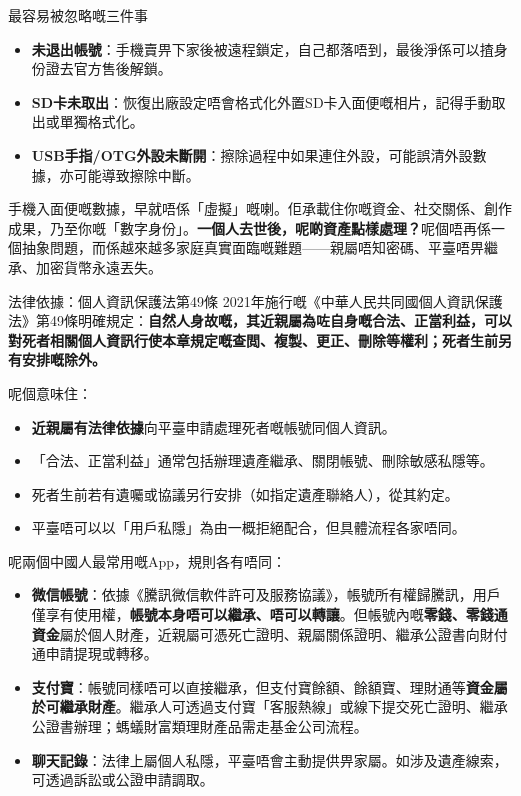 \begin{tcbwarn}{最容易被忽略嘅三件事}
\begin{itemize}
  \item \textbf{未退出帳號}：手機賣畀下家後被遠程鎖定，自己都落唔到，最後淨係可以揸身份證去官方售後解鎖。
  \item \textbf{SD卡未取出}：恢復出廠設定唔會格式化外置SD卡入面便嘅相片，記得手動取出或單獨格式化。
  \item \textbf{USB手指/OTG外設未斷開}：擦除過程中如果連住外設，可能誤清外設數據，亦可能導致擦除中斷。
\end{itemize}

\end{tcbwarn}


手機入面便嘅數據，早就唔係「虛擬」嘅喇。佢承載住你嘅資金、社交關係、創作成果，乃至你嘅「數字身份」。\textbf{一個人去世後，呢啲資產點樣處理？}呢個唔再係一個抽象問題，而係越來越多家庭真實面臨嘅難題——親屬唔知密碼、平臺唔畀繼承、加密貨幣永遠丟失。

\begin{tcbinfo}{法律依據：個人資訊保護法第49條}
2021年施行嘅《中華人民共同國個人資訊保護法》第49條明確規定：\textbf{自然人身故嘅，其近親屬為咗自身嘅合法、正當利益，可以對死者相關個人資訊行使本章規定嘅查閲、複製、更正、刪除等權利；死者生前另有安排嘅除外。}

呢個意味住：

\begin{itemize}
  \item \textbf{近親屬有法律依據}向平臺申請處理死者嘅帳號同個人資訊。
  \item 「合法、正當利益」通常包括辦理遺產繼承、關閉帳號、刪除敏感私隱等。
  \item 死者生前若有遺囑或協議另行安排（如指定遺產聯絡人），從其約定。
  \item 平臺唔可以以「用戶私隱」為由一概拒絕配合，但具體流程各家唔同。
\end{itemize}

\end{tcbinfo}


呢兩個中國人最常用嘅App，規則各有唔同：

\begin{itemize}
  \item \textbf{微信帳號}：依據《騰訊微信軟件許可及服務協議》，帳號所有權歸騰訊，用戶僅享有使用權，\textbf{帳號本身唔可以繼承、唔可以轉讓}。但帳號內嘅\textbf{零錢、零錢通資金}屬於個人財產，近親屬可憑死亡證明、親屬關係證明、繼承公證書向財付通申請提現或轉移。
  \item \textbf{支付寶}：帳號同樣唔可以直接繼承，但支付寶餘額、餘額寶、理財通等\textbf{資金屬於可繼承財產}。繼承人可透過支付寶「客服熱線」或線下提交死亡證明、繼承公證書辦理；螞蟻財富類理財產品需走基金公司流程。
  \item \textbf{聊天記錄}：法律上屬個人私隱，平臺唔會主動提供畀家屬。如涉及遺產線索，可透過訴訟或公證申請調取。
\end{itemize}

